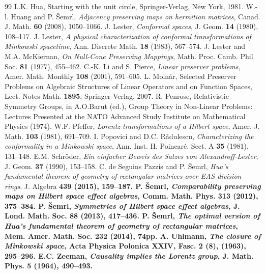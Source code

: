 \documentclass[10pt,a4paper]{amsart}
\theoremstyle{definition}
\theoremstyle{remark}
\numberwithin{subsection}{section}
\numberwithin{equation}{section}
\begin{document}
\begin{thebibliography}{99}
 L.K. Hua, Starting with the unit circle, Springer-Verlag, New York, 1981.
 W.-l. Huang and P. \v Semrl, \emph{Adjacency preserving maps on hermitian matrices}, Canad. J. Math. \textbf{60} (2008), 1050--1066.
 J. Lester, \emph{Conformal spaces}, J. Geom. \textbf{14} (1980), 108--117.
 J. Lester, \emph{A physical characterization of conformal transformations of Minkowski spacetime}, Ann. Discrete Math. \textbf{18} (1983), 567--574.
 J. Lester and M.A. McKiernan, \emph{On Null-Cone Preserving Mappings}, Math. Proc. Camb. Phil. Soc. \textbf{81} (1977), 455--462.
 C.-K. Li and S. Pierce, \emph{Linear preserver problems}, Amer. Math. Monthly \textbf{108} (2001), 591--605. %
 L. Moln\' ar, Selected Preserver Problems on Algebraic Structures of Linear Operators and on Function Spaces, Lect. Notes Math. {\bf 1895}, Springer-Verlag, 2007. %
 R. Penrose, Relativistic Symmetry Groups, in A.O.Barut (ed.), Group Theory in Non-Linear Problems: Lectures Presented at the NATO Advanced Study Institute on Mathematical Physics (1974).
 W.F. Pfeffer, \emph{Lorentz transformations of a Hilbert space}, Amer. J. Math. \textbf{103} (1981), 691--709.
 I. Popovici and D.C. R\v{a}dulescu, \emph{Characterizing the conformality in a Minkowski space}, Ann. Inst. H. Poincar\'{e}. Sect. A \textbf{35} (1981), 131--148.
 E.M. Schr\" oder, \emph{Ein einfacher Beweis des Satzes von Alexandroff-Lester}, J. Geom. \textbf{37} (1990), 153--158.
 C. de Seguins Pazzis and P. \v Semrl, \emph{Hua's fundamental theorem of geometry of rectangular matrices over EAS division rings}, J. Algebra \bf 439 \rm (2015), 159--187. %
 P. \v Semrl, \emph{Comparability preserving maps on Hilbert space effect algebras}, Comm. Math. Phys. \textbf{313} (2012), 375--384.
 P. \v Semrl, \emph{Symmetries of Hilbert space effect algebras}, J. Lond. Math. Soc. \textbf{88 }(2013), 417--436.
 P. \v Semrl, \emph{The optimal version of Hua's fundamental theorem of geometry of rectangular matrices}, Mem. Amer. Math. Soc. \bf 232 \rm (2014), 74pp. %
 A. Uhlmann, \emph{The closure of Minkowski space}, Acta Physica Polonica \textbf{XXIV}, Fasc. 2 (8), (1963), 295--296. %
 E.C. Zeeman, \emph{Causality implies the Lorentz group}, J. Math. Phys. \textbf{5} (1964), 490--493.
\end{thebibliography}
\end{document}
